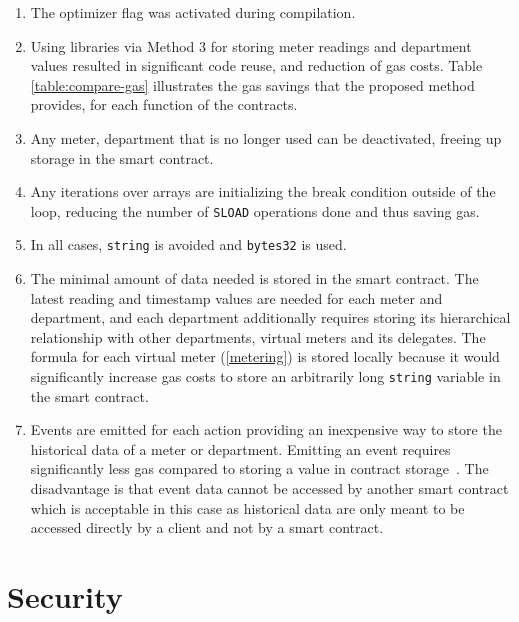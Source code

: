 \begin{enumerate}
    \item The optimizer flag was activated during compilation.
    \item Using libraries via Method 3 for storing meter readings and department values resulted in significant code reuse, and reduction of gas costs. Table \ref{table:compare-gas} illustrates the gas savings that the proposed method provides, for each function of the contracts.
    \item Any meter, department that is no longer used can be deactivated, freeing up storage in the smart contract.
    \item Any iterations over arrays are initializing the break condition outside of the loop, reducing the number of \texttt{SLOAD} operations done and thus saving gas.
    \item In all cases, \texttt{string} is avoided and \texttt{bytes32} is used. %
    \item The minimal amount of data needed is stored in the smart contract. The latest reading and timestamp values are needed for each meter and department, and each department additionally requires storing its hierarchical relationship with other departments, virtual meters and its delegates. The formula for each virtual meter (\ref{metering}) is stored locally because it would significantly increase gas costs to store an arbitrarily long \texttt{string} variable in the smart contract.
    \item Events are emitted for each action providing an inexpensive way to store the historical data of a meter or department. Emitting an event requires significantly less gas compared to storing a value in contract storage~\cite{events}. The disadvantage is that event data cannot be accessed by another smart contract which is acceptable in this case as historical data are only meant to be accessed directly by a client and not by a smart contract.
\end{enumerate}



\section{Security}

